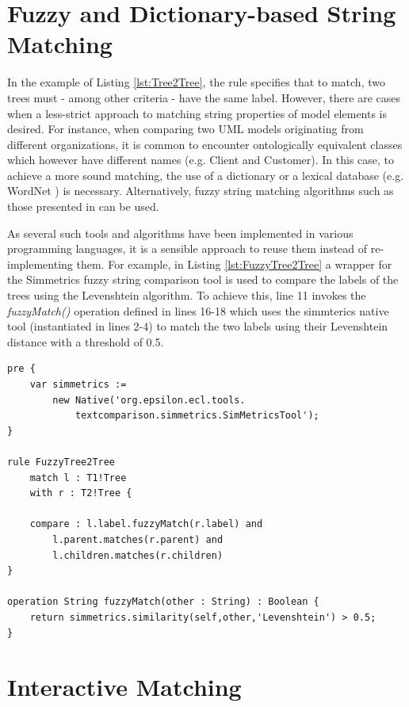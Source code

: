\section{Fuzzy and Dictionary-based String Matching}
\label{sec:FuzzyComparison}

In the example of Listing \ref{lst:Tree2Tree}, the rule specifies that to match, two trees must - among other criteria - have the same label. However, there are cases when a less-strict approach to matching string properties of model elements is desired. For instance, when comparing two UML models originating from different organizations, it is common to encounter ontologically equivalent classes which however have different names (e.g. Client and Customer). In this case, to achieve a more sound matching, the use of a dictionary or a lexical database (e.g. WordNet \cite{Wordnet}) is necessary. Alternatively, fuzzy string matching algorithms such as those presented in \cite{FuzzyStringMatching} can be used.

As several such tools and algorithms have been implemented in various programming languages, it is a sensible approach to reuse them instead of re-implementing them. For example, in Listing \ref{lst:FuzzyTree2Tree} a wrapper for the Simmetrics \cite{Simmetrics} fuzzy string comparison tool is used to compare the labels of the trees using the Levenshtein \cite{Levenshtein} algorithm. To achieve this, line 11 invokes the \emph{fuzzyMatch()} operation defined in lines 16-18 which uses the simmterics native tool (instantiated in lines 2-4) to match the two labels using their Levenshtein distance with a threshold of 0.5.

\begin{lstlisting}[basicstyle=\ttfamily\footnotesize, flexiblecolumns=true, numbers=none, nolol=true, caption=The FuzzyTree2Tree rule, label=lst:FuzzyTree2Tree, language=ECL, numbers=left, tabsize=2]
pre {
	var simmetrics := 
		new Native('org.epsilon.ecl.tools.
			textcomparison.simmetrics.SimMetricsTool'); 
}

rule FuzzyTree2Tree 
	match l : T1!Tree
	with r : T2!Tree {
	
	compare : l.label.fuzzyMatch(r.label) and 
		l.parent.matches(r.parent) and
		l.children.matches(r.children)
}

operation String fuzzyMatch(other : String) : Boolean {
	return simmetrics.similarity(self,other,'Levenshtein') > 0.5;
}\end{lstlisting}

\section{Interactive Matching}
\label{sec:InteractiveModelComparison}

